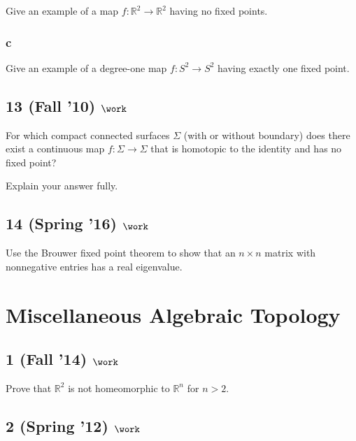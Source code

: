Give an example of a map \(f : {\mathbb{R}}^2 \to {\mathbb{R}}^2\)
having no fixed points.

\hypertarget{c-3}{%
\subsubsection{c}\label{c-3}}

Give an example of a degree-one map \(f : S^2 \to S^2\) having exactly
one fixed point.

\hypertarget{fall-10-work-3}{%
\subsection{\texorpdfstring{13 (Fall '10)
\(\work\)}{13 (Fall '10) \textbackslash work}}\label{fall-10-work-3}}

For which compact connected surfaces \(\Sigma\) (with or without
boundary) does there exist a continuous map \(f : \Sigma \to \Sigma\)
that is homotopic to the identity and has no fixed point?

Explain your answer fully.

\hypertarget{spring-16-work-3}{%
\subsection{\texorpdfstring{14 (Spring '16)
\(\work\)}{14 (Spring '16) \textbackslash work}}\label{spring-16-work-3}}

Use the Brouwer fixed point theorem to show that an \(n \times n\)
matrix with nonnegative entries has a real eigenvalue.

\hypertarget{miscellaneous-algebraic-topology}{%
\section{Miscellaneous Algebraic
Topology}\label{miscellaneous-algebraic-topology}}

\hypertarget{fall-14-work-6}{%
\subsection{\texorpdfstring{1 (Fall '14)
\(\work\)}{1 (Fall '14) \textbackslash work}}\label{fall-14-work-6}}

Prove that \({\mathbb{R}}^2\) is not homeomorphic to \({\mathbb{R}}^n\)
for \(n > 2\).

\hypertarget{spring-12-work-4}{%
\subsection{\texorpdfstring{2 (Spring '12)
\(\work\)}{2 (Spring '12) \textbackslash work}}\label{spring-12-work-4}}

